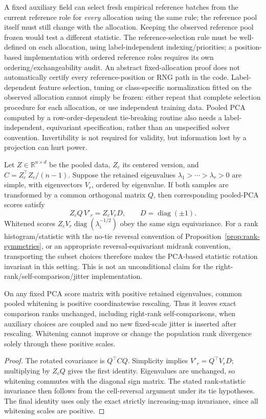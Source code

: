 {A fixed auxiliary field can select fresh empirical reference batches from the current reference role for \emph{every} allocation using the same rule; the reference pool itself must still change with the allocation. Keeping the observed reference pool frozen would test a different statistic. The reference-selection rule must be well-defined on each allocation, using label-independent indexing/priorities; a position-based implementation with ordered reference roles requires its own ordering/exchangeability audit. An abstract fixed-allocation proof does not automatically certify every reference-position or RNG path in the code. Label-dependent feature selection, tuning or class-specific normalization fitted on the observed allocation cannot simply be frozen: either repeat that complete selection procedure for each allocation, or use independent training data. Pooled PCA computed by a row-order-dependent tie-breaking routine also needs a label-independent, equivariant specification, rather than an unspecified solver convention. Invertibility is not required for validity, but information lost by a projection can hurt power.

\begin{proposition}\label{prop:pca-equivariance}
Let $Z\in\mathbb R^{n\times d}$ be the pooled data, $Z_c$ its centered version, and $C=Z_c^\top Z_c/(n-1)$. Suppose the retained eigenvalues $\lambda_1>\cdots>\lambda_r>0$ are simple, with eigenvectors $V_r$, ordered by eigenvalue. If both samples are transformed by a common orthogonal matrix $Q$, then corresponding pooled-PCA scores satisfy
\[
Z_c Q\,V'_r=Z_cV_r D,\qquad D=\operatorname{diag}(\pm1).
\]
Whitened scores $Z_cV_r\operatorname{diag}(\lambda_i^{-1/2})$ obey the same sign equivariance. For a rank histogram/statistic with the no-tie reversal convention of Proposition~\ref{prop:rank-symmetries}, or an appropriate reversal-equivariant midrank convention, transporting the subset choices therefore makes the PCA-based statistic rotation invariant in this setting. This is not an unconditional claim for the right-rank/self-comparison/jitter implementation.

On any fixed PCA score matrix with positive retained eigenvalues, common pooled whitening is positive coordinatewise rescaling. Thus it leaves exact comparison ranks unchanged, including right-rank self-comparisons, when auxiliary choices are coupled and no new fixed-scale jitter is inserted after rescaling. Whitening cannot improve or change the population rank divergence solely through these positive scales.
\end{proposition}
\begin{proof}
The rotated covariance is $Q^\top C Q$. Simplicity implies $V'_r=Q^\top V_rD$; multiplying by $Z_cQ$ gives the first identity. Eigenvalues are unchanged, so whitening commutes with the diagonal sign matrix. The stated rank-statistic invariance then follows from the cell-reversal argument under its tie hypotheses. The final identity uses only the exact strictly increasing-map invariance, since all whitening scales are positive.
\end{proof}

}
